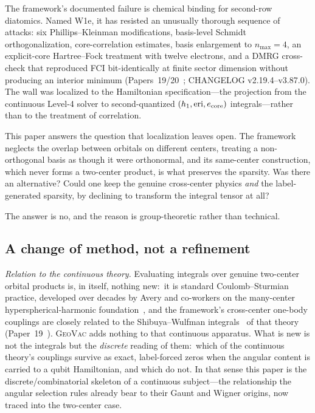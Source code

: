 \documentclass[aps,pra,twocolumn,superscriptaddress,longbibliography]{revtex4-2}
\begin{document}
The framework's documented failure is chemical binding for second-row
diatomics.  Named W1e, it has resisted an unusually thorough sequence of
attacks: six Phillips--Kleinman modifications, basis-level Schmidt
orthogonalization, core-correlation estimates, basis enlargement to
$n_{\max} = 4$, an explicit-core Hartree--Fock treatment with twelve
electrons, and a DMRG cross-check that reproduced FCI bit-identically at
finite sector dimension without producing an interior minimum
(Papers~19/20~\cite{loutey_paper19,loutey_paper20}; CHANGELOG v2.19.4--v3.87.0).  The wall was localized to
the Hamiltonian specification---the projection from the continuous
Level-4 solver to second-quantized $(h_1, \text{eri}, e_{\rm core})$
integrals---rather than to the treatment of correlation.

This paper answers the question that localization leaves open.  The
framework neglects the overlap between orbitals on different centers,
treating a non-orthogonal basis as though it were orthonormal, and its
same-center construction, which never forms a two-center product, is what
preserves the sparsity.  Was there an alternative?  Could
one keep the genuine cross-center physics \emph{and} the label-generated
sparsity, by declining to transform the integral tensor at all?

The answer is no, and the reason is group-theoretic rather than technical.

\subsection{A change of method, not a refinement}
\label{sec:method_break}

\emph{Relation to the continuous theory.}  Evaluating integrals over
genuine two-center orbital products is, in itself, nothing new:\ it is
standard Coulomb--Sturmian practice, developed over decades by Avery and
co-workers on the many-center hyperspherical-harmonic
foundation~\cite{avery1989, avery2006}, and the framework's cross-center
one-body couplings are closely related to the Shibuya--Wulfman
integrals~\cite{shibuya1965} of that theory
(Paper~19~\cite{loutey_paper19}).  \textsc{GeoVac} adds nothing to that
continuous apparatus.  What is new is not the integrals but the
\emph{discrete} reading of them:\ which of the continuous theory's
couplings survive as exact, label-forced zeros when the angular content
is carried to a qubit Hamiltonian, and which do not.  In that sense this
paper is the discrete/combinatorial skeleton of a continuous
subject---the relationship the angular selection rules already bear to
their Gaunt and Wigner origins, now traced into the two-center case.
\end{document}
